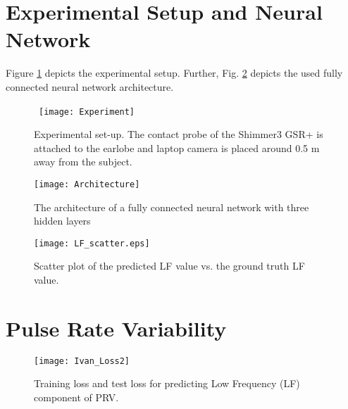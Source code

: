 %
\section{Experimental Setup and Neural Network}

Figure \ref{fig:experiment} depicts the experimental setup. Further, Fig. \ref{fig:arch} depicts the used fully connected neural network architecture. 

\begin{figure}[htbp]
	\centering\
	\texttt{[image: Experiment]}
	\vspace{-.2in}
	\caption{Experimental set-up. The contact probe of the Shimmer3 GSR+ is attached to the earlobe and laptop camera is placed around 0.5 m away from the subject.}
	\label{fig:experiment}
		\vspace{-.1in}
\end{figure}

\begin{figure}[htbp]
	\centering
	\texttt{[image: Architecture]}
		\vspace{-.2in}
	\caption{The architecture of a fully connected neural network with three hidden layers}
		\vspace{-.1in}
	\label{fig:arch}
\end{figure} 

\begin{figure}[htbp]
	\centering
	\texttt{[image: LF\_scatter.eps]}
	\vspace{-.2in}
	\caption{Scatter plot of the predicted LF value vs. the ground truth LF value.}
	\label{fig:scatter_LF}
	\vspace{-.1in}
\end{figure}
\section{Pulse Rate Variability}\label{sec:appendix}


%


\begin{figure}[htbp]
	\centering
	\texttt{[image: Ivan\_Loss2]}
	\vspace{-.1in}
	\caption{Training loss and test loss for predicting Low Frequency (LF) component of PRV. }
	\label{fig:LF}
	\vspace{-.1in}
\end{figure}



